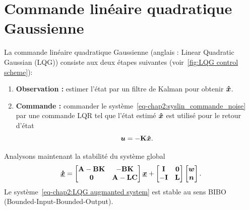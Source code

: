 \section{Commande linéaire quadratique Gaussienne}
La commande linéaire quadratique Gaussienne (anglais : Linear Quadratic Gaussian (LQG)) consiste aux deux étapes suivantes (voir~\cref{fig:LQG control scheme}): 
\begin{enumerate}
	\item \textbf{Observation :} estimer l'état par un filtre de Kalman pour obtenir $\bm{\hat{x}}$.
	\item \textbf{Commande :} commander le système~\eqref{eq-chap2:syslin_commande_noise} par une commande LQR tel que l'état estimé $\bm{\hat{x}}$ est utilisé pour le retour d'état
	\begin{equation}\label{eq-chap2:LQG control}
		\bm{u} = -\mathbf{K}\bm{\hat{x}}.
	\end{equation}
\end{enumerate} 
Analysons maintenant la stabilité du système global 
\begin{equation}\label{eq-chap2:LQG augmanted system}
	\underline{\bm{\dot{x}}} = \begin{bmatrix}
		\mathbf{A}-\mathbf{B}\mathbf{K} & -\mathbf{B}\mathbf{K} \\ \mathbf{0} & \mathbf{A}-\mathbf{L}\mathbf{C}
	\end{bmatrix}\underline{\bm{x}} + \begin{bmatrix}
	\mathbf{I} & \mathbf{0} \\ -\mathbf{I} & \mathbf{L}
	\end{bmatrix}\begin{bmatrix}
	\bm{w}\\\bm{n}
	\end{bmatrix}.
\end{equation} 
Le système~\eqref{eq-chap2:LQG augmanted system} est stable au sens BIBO (Bounded-Input-Bounded-Output).
